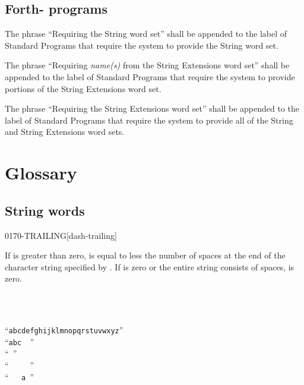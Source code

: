 \subsection{Forth-\snapshot{} programs} %

The phrase ``Requiring the String word set'' shall be appended to
the label of Standard Programs that require the system to provide
the String word set.

The phrase ``Requiring \emph{name(s)} from the String Extensions
word set'' shall be appended to the label of Standard Programs that
require the system to provide portions of the String Extensions
word set.

The phrase ``Requiring the String Extensions word set'' shall be
appended to the label of Standard Programs that require the system
to provide all of the String and String Extensions word sets.


\section{Glossary} %

\subsection{String words} %


\begin{worddef}{0170}{-TRAILING}[dash-trailing]
\item {}

	If  is greater than zero,  is equal to
	 less the number of spaces at the end of the
	character string specified by . If 
	is zero or the entire string consists of spaces,  is
	zero.

	\begin{testing}
		 \\
		 \\

				\tab {} ``\texttt{abcdefghijklmnopqrstuvwxyz}'' \\
		 			\tab[2.5]  ``\texttt{abc~~}'' \\
							\tab[5.2]  ``\texttt{~}'' \\
			\tab[1]  ``\texttt{~~~~~}'' \\
						\tab[2.8]  ``\texttt{~~~a~}''
	\end{testing}
\end{worddef}


